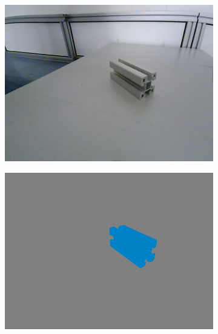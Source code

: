 	\begin{figure}[h]
		\centering
		\begin{subfigure}{.24\textwidth}
			\centering
			\includegraphics[width=1\linewidth]{images/sample_predictions/s40_40_G_013}
		\end{subfigure}
		\begin{subfigure}{.24\textwidth}
			\centering
			\includegraphics[width=1\linewidth]{images/sample_predictions/s40_40_G_013_full_gt}
		\end{subfigure}
		\begin{subfigure}{.24\textwidth}
			\centering

\end{subfigure}
\end{figure}
